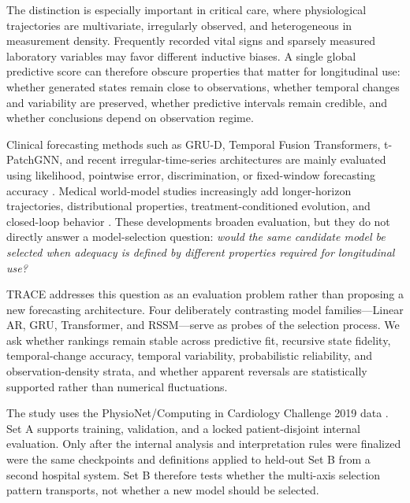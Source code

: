 \documentclass[preprint,12pt]{elsarticle}
\begin{document}
The distinction is especially important in critical care, where physiological trajectories are multivariate, irregularly observed, and heterogeneous in measurement density. Frequently recorded vital signs and sparsely measured laboratory variables may favor different inductive biases. A single global predictive score can therefore obscure properties that matter for longitudinal use: whether generated states remain close to observations, whether temporal changes and variability are preserved, whether predictive intervals remain credible, and whether conclusions depend on observation regime.

Clinical forecasting methods such as GRU-D, Temporal Fusion Transformers, t-PatchGNN, and recent irregular-time-series architectures are mainly evaluated using likelihood, pointwise error, discrimination, or fixed-window forecasting accuracy \cite{che2018grud,lim2021tft,zhang2024tpatchgnn,liu2026mtfpdg}. Medical world-model studies increasingly add longer-horizon trajectories, distributional properties, treatment-conditioned evolution, and closed-loop behavior \cite{makarov2025dtgpt,yang2025mewm,mu2026ehrworld,wang2026chronomedicalworld,wu2026sepsisagent}. These developments broaden evaluation, but they do not directly answer a model-selection question: \emph{would the same candidate model be selected when adequacy is defined by different properties required for longitudinal use?}

TRACE addresses this question as an evaluation problem rather than proposing a new forecasting architecture. Four deliberately contrasting model families---Linear AR, GRU, Transformer, and RSSM---serve as probes of the selection process. We ask whether rankings remain stable across predictive fit, recursive state fidelity, temporal-change accuracy, temporal variability, probabilistic reliability, and observation-density strata, and whether apparent reversals are statistically supported rather than numerical fluctuations.

The study uses the PhysioNet/Computing in Cardiology Challenge 2019 data \cite{reyna2020sepsis}. Set A supports training, validation, and a locked patient-disjoint internal evaluation. Only after the internal analysis and interpretation rules were finalized were the same checkpoints and definitions applied to held-out Set B from a second hospital system. Set B therefore tests whether the multi-axis selection pattern transports, not whether a new model should be selected.
\end{document}
